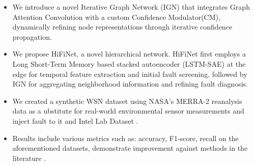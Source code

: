 \begin{itemize} 
  \item We introduce a novel Iterative Graph Network (IGN) that integrates Graph Attention Convolution with a custom Confidence Modulator(CM), dynamically refining node representations through iterative confidence propagation.
  \item We propose HiFiNet, a novel hierarchical network. HiFiNet first employs a Long Short-Term Memory based stacked autoencoder (LSTM-SAE) at the edge for temporal feature extraction and initial fault screening, followed by IGN for aggregating neighborhood information and refining fault diagnosis.
  \item We created a synthetic WSN dataset using NASA’s MERRA-2 reanalysis data as a ubstitute for real-world environmental sensor measurements and inject fault to it and Intel Lab Dataset \cite{Intel2004}.
  \item Results include various metrics such as: accuracy, F1-score, recall on the aforementioned datasets, demonstrate improvement against methods in the literature .
\end{itemize}
